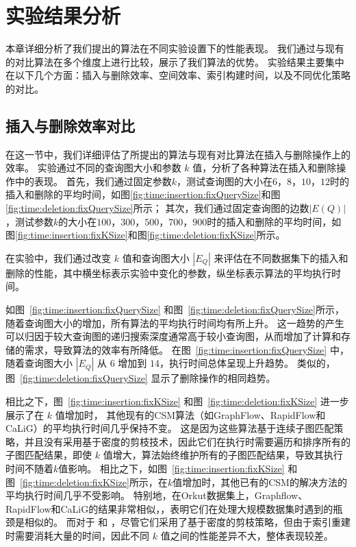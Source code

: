 \section{实验结果分析}
\label{ch5:overall-compare}
本章详细分析了我们提出的算法在不同实验设置下的性能表现。
我们通过与现有的对比算法在多个维度上进行比较，展示了我们算法的优势。
实验结果主要集中在以下几个方面：插入与删除效率、空间效率、索引构建时间，以及不同优化策略的对比。
\subsection{插入与删除效率对比}
\label{ch5:insertion-deletion}
在这一节中，我们详细评估了所提出的算法与现有对比算法在插入与删除操作上的效率。
实验通过不同的查询图大小和参数 $k$ 值，分析了各种算法在插入和删除操作中的表现。
首先，我们通过固定参数$k$，测试查询图的大小在$6$，$8$，$10$，$12$时的插入和删除的平均时间，如图\ref{fig:time:insertion:fixQuerySize}和图\ref{fig:time:deletion:fixQuerySize}所示；
其次，我们通过固定查询图的边数$|E(Q)|$，测试参数$k$的大小在$100$，$300$，$500$，$700$，$900$时的插入和删除的平均时间，如图\ref{fig:time:insertion:fixKSize}和图\ref{fig:time:deletion:fixKSize}所示。






在实验中，我们通过改变 $k$ 值和查询图大小 $|E_Q|$ 来评估在不同数据集下的插入和删除的性能，其中横坐标表示实验中变化的参数，纵坐标表示算法的平均执行时间。



如图~\ref{fig:time:insertion:fixQuerySize} 和图~\ref{fig:time:deletion:fixQuerySize}所示，随着查询图大小的增加，所有算法的平均执行时间均有所上升。
这一趋势的产生可以归因于较大查询图的递归搜索深度通常高于较小查询图，从而增加了计算和存储的需求，导致算法的效率有所降低。
在图~\ref{fig:time:insertion:fixQuerySize} 中，随着查询图大小 $|E_Q|$ 从 $6$ 增加到 $14$，执行时间总体呈现上升趋势。
类似的，图~\ref{fig:time:deletion:fixQuerySize} 显示了删除操作的相同趋势。

相比之下，图~\ref{fig:time:insertion:fixKSize} 和图~\ref{fig:time:deletion:fixKSize} 进一步展示了在 $k$ 值增加时，
其他现有的CSM算法（如GraphFlow、RapidFlow和CaLiG）的平均执行时间几乎保持不变。
这是因为这些算法基于连续子图匹配策略，并且没有采用基于密度的剪枝技术，因此它们在执行时需要遍历和排序所有的子图匹配结果，即使 $k$ 值增大，算法始终维护所有的子图匹配结果，导致其执行时间不随着$k$值影响。
相比之下，如图~\ref{fig:time:insertion:fixKSize} 和图~\ref{fig:time:deletion:fixKSize}所示，在$k$值增加时，其他已有的CSM的解决方法的平均执行时间几乎不受影响。
特别地，在Orkut数据集上，Graphflow、RapidFlow和CaLiG的结果非常相似，，表明它们在处理大规模数据集时遇到的瓶颈是相似的。
而对于 \itk 和 \pm，尽管它们采用了基于密度的剪枝策略，但由于索引重建时需要消耗大量的时间，因此不同 $k$ 值之间的性能差异不大，整体表现较差。

